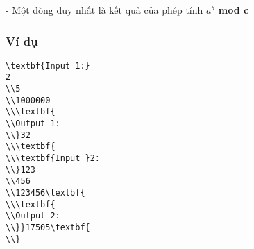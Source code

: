     - Một dòng duy nhất là kết quả của phép tính    \textbf{     $a^{b}$     mod c    }

\subsubsection{   Ví dụ  }
\begin{verbatim}
\textbf{Input 1:}
2
\\5
\\1000000
\\\textbf{
\\Output 1:
\\}32
\\\textbf{
\\\textbf{Input }2:
\\}123
\\456
\\123456\textbf{
\\\textbf{
\\Output 2:
\\}}17505\textbf{
\\}\end{verbatim}
